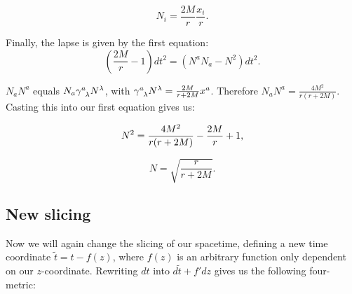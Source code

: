 \documentclass[twoside, openright]{RadboudReport}
\begin{document}
\begin{equation}
    N_i = \frac{2M}{r}\frac{x_i}{r}.
\end{equation}

Finally, the lapse is given by the first equation:
\begin{equation}
    \left(\frac{2M}{r}-1\right)dt^2= (N^aN_a-N^2)dt^2.
\end{equation}

$N_aN^a$ equals $N_a \gamma^a_{\hphantom{a}\lambda}N^\lambda$, with $\gamma^a_{\hphantom{a}\lambda}N^\lambda = \frac{2M}{r+2M}x^a$. Therefore $N_aN^a = \frac{4M^2}{r(r+2M)}$. Casting this into our first equation gives us:

\begin{equation}
    N^2= \frac{4M^2}{r(r+2M)}-\frac{2M}{r}+1\\ ,
\end{equation}

\begin{equation}
    N= \sqrt{\frac{r}{r+2M}}.
\end{equation}

\subsection{New slicing}

Now we will again change the slicing of our spacetime, defining a new time coordinate $\tilde{t} = t - f(z)$, where $f(z)$ is an arbitrary function only dependent on our $z$-coordinate. Rewriting $dt$ into $d\tilde{t} + f'dz$ gives us the following four-metric:
\end{document}
